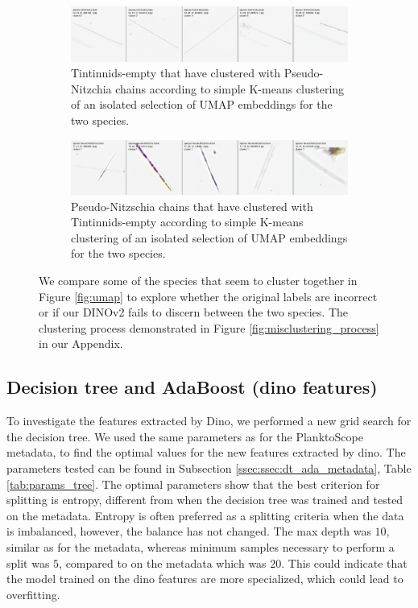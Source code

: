 \begin{figure}[H]
    \centering
    \begin{subfigure}[b]{1\linewidth}
        \includegraphics[width=\linewidth]{examples/tests_eb/figs/misclustered_empty.png}
        \caption{Tintinnids-empty that have clustered with Pseudo-Nitzchia chains according to simple K-means clustering of an isolated selection of UMAP embeddings for the two species.}
    \end{subfigure}
    
    \vspace{1em}
    
    \begin{subfigure}[b]{1\linewidth}
        \includegraphics[width=\linewidth]{examples/tests_eb/figs/misclustered_pseudo-nitz.png}
        \caption{Pseudo-Nitzschia chains that have clustered with Tintinnids-empty according to simple K-means clustering of an isolated selection of UMAP embeddings for the two species.}
    \end{subfigure}
    \caption{We compare some of the species that seem to cluster together in Figure \ref{fig:umap} to explore whether the original labels are incorrect or if our DINOv2 fails to discern between the two species. The clustering process demonstrated in Figure \ref{fig:misclustering_process} in our Appendix.}
    \label{fig:misclusters}
\end{figure}


\subsection{Decision tree and AdaBoost (dino features)}\label{ssec:dt_ada_dino}
To investigate the features extracted by Dino, we performed a new grid search for the decision tree. We used the same parameters as for the PlanktoScope metadata, to find the optimal values for the new features extracted by dino. The parameters tested can be found in Subsection \ref{ssec:ssec:dt_ada_metadata}, Table \ref{tab:params_tree}. The optimal parameters show that the best criterion for splitting is entropy, different from when the decision tree was trained and tested on the metadata. Entropy is often preferred as a splitting criteria when the data is imbalanced, however, the balance has not changed. The max depth was $10$, similar as for the metadata, whereas minimum samples necessary to perform a split was $5$, compared to on the metadata which was $20$. This could indicate that the model trained on the dino features are more specialized, which could lead to overfitting.

